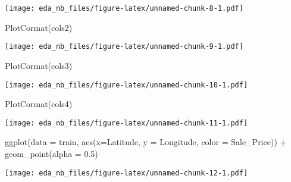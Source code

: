 \documentclass[
]{article}
\newenvironment{Shaded}{\begin{snugshade}}{\end{snugshade}}
\newcommand{\AttributeTok}[1]{\textcolor[rgb]{0.77,0.63,0.00}{#1}}
\newcommand{\FloatTok}[1]{\textcolor[rgb]{0.00,0.00,0.81}{#1}}
\newcommand{\FunctionTok}[1]{\textcolor[rgb]{0.00,0.00,0.00}{#1}}
\newcommand{\NormalTok}[1]{#1}
\newcommand{\SpecialCharTok}[1]{\textcolor[rgb]{0.00,0.00,0.00}{#1}}
\begin{document}
\texttt{[image: eda\_nb\_files/figure-latex/unnamed-chunk-8-1.pdf]}

\begin{Shaded}
\begin{Highlighting}[]
\FunctionTok{PlotCormat}\NormalTok{(cols2)}
\end{Highlighting}
\end{Shaded}

\texttt{[image: eda\_nb\_files/figure-latex/unnamed-chunk-9-1.pdf]}

\begin{Shaded}
\begin{Highlighting}[]
\FunctionTok{PlotCormat}\NormalTok{(cols3)}
\end{Highlighting}
\end{Shaded}

\texttt{[image: eda\_nb\_files/figure-latex/unnamed-chunk-10-1.pdf]}

\begin{Shaded}
\begin{Highlighting}[]
\FunctionTok{PlotCormat}\NormalTok{(cols4)}
\end{Highlighting}
\end{Shaded}

\texttt{[image: eda\_nb\_files/figure-latex/unnamed-chunk-11-1.pdf]}

\begin{Shaded}
\begin{Highlighting}[]
\FunctionTok{ggplot}\NormalTok{(}\AttributeTok{data =}\NormalTok{ train, }\FunctionTok{aes}\NormalTok{(}\AttributeTok{x=}\NormalTok{Latitude, }\AttributeTok{y =}\NormalTok{ Longitude, }\AttributeTok{color =}\NormalTok{ Sale\_Price)) }\SpecialCharTok{+}
  \FunctionTok{geom\_point}\NormalTok{(}\AttributeTok{alpha =} \FloatTok{0.5}\NormalTok{)}
\end{Highlighting}
\end{Shaded}

\texttt{[image: eda\_nb\_files/figure-latex/unnamed-chunk-12-1.pdf]}
\end{document}
